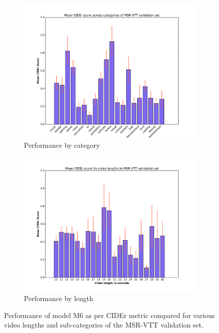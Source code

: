 \begin{figure}[ht]
\begin{center}
  \begin{adjustbox}{center}
  \begin{subfigure}[c]{0.5\linewidth}
    \centering
    \includegraphics[trim={2cm 0 2cm 0},clip,width=1.0\linewidth]{images/VTTCiderCateg.pdf}%
    \caption{Performance by category}%
    \label{fig:VttCategPerf}
  \end{subfigure}%
  \begin{subfigure}[c]{0.5\linewidth}
    \centering
    \includegraphics[trim={2cm 0 2cm 0},clip, width=1.0\linewidth]{images/VTTCiderLengths.pdf}
    \caption{Performance by length}
    \label{fig:VttLenPerf}
  \end{subfigure}
  \end{adjustbox}
\end{center}
\vspace*{-5mm}
\caption{Performance of model M6 as per CIDEr metric compared for
        various video lengths and sub-categories of the MSR-VTT validation set.}
\label{fig:VttPerf}
\end{figure}

